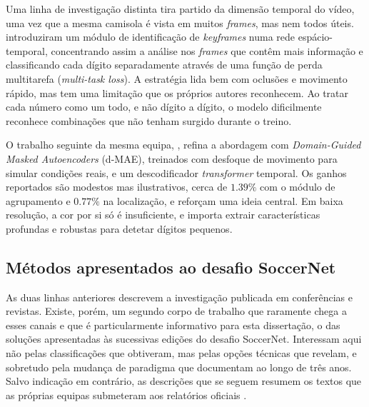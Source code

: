 Uma linha de investigação distinta tira partido da dimensão temporal do vídeo, uma vez que a mesma camisola é vista em muitos \emph{frames}, mas nem todos úteis. \citet{balaji2023jersey} introduziram um módulo de identificação de \emph{keyframes} numa rede espácio-temporal, concentrando assim a análise nos \emph{frames} que contêm mais informação e classificando cada dígito separadamente através de uma função de perda multitarefa (\emph{multi-task loss}). A estratégia lida bem com oclusões e movimento rápido, mas tem uma limitação que os próprios autores reconhecem. Ao tratar cada número como um todo, e não dígito a dígito, o modelo dificilmente reconhece combinações que não tenham surgido durante o treino.

O trabalho seguinte da mesma equipa, \citet{balaji2024dmae}, refina a abordagem com \emph{Domain-Guided Masked Autoencoders} (d-MAE), treinados com desfoque de movimento para simular condições reais, e um descodificador \emph{transformer} temporal. Os ganhos reportados são modestos mas ilustrativos, cerca de $1{.}39\%$ com o módulo de agrupamento e $0{.}77\%$ na localização, e reforçam uma ideia central. Em baixa resolução, a cor por si só é insuficiente, e importa extrair características profundas e robustas para detetar dígitos pequenos.

\subsection{Métodos apresentados ao desafio SoccerNet}\label{sec:jnr-desafio}

As duas linhas anteriores descrevem a investigação publicada em conferências e revistas. Existe, porém, um segundo corpo de trabalho que raramente chega a esses canais e que é particularmente informativo para esta dissertação, o das soluções apresentadas às sucessivas edições do desafio SoccerNet. Interessam aqui não pelas classificações que obtiveram, mas pelas opções técnicas que revelam, e sobretudo pela mudança de paradigma que documentam ao longo de três anos. Salvo indicação em contrário, as descrições que se seguem resumem os textos que as próprias equipas submeteram aos relatórios oficiais \citep{cioppa2023soccernet, cioppa2024soccernet, giancola2025soccernet}.

